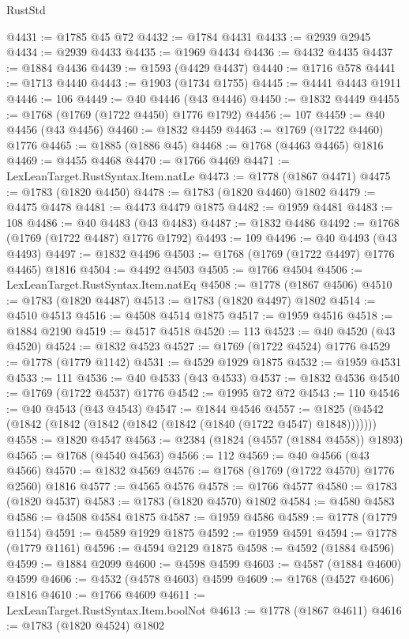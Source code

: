 \begin{lexlean}{RustStd}
\begin{coremodule}
@4431 := @1785 @45 @72
@4432 := @1784 @4431
@4433 := @2939 @2945
@4434 := @2939 @4433
@4435 := @1969 @4434
@4436 := @4432 @4435
@4437 := @1884 @4436
@4439 := @1593 (@4429 @4437)
@4440 := @1716 @578
@4441 := @1713 @4440
@4443 := @1903 (@1734 @1755)
@4445 := @4441 @4443 @1911
@4446 := 106
@4449 := @40 @4446 (@43 @4446)
@4450 := @1832 @4449
@4455 := @1768 (@1769 (@1722 @4450) @1776 @1792)
@4456 := 107
@4459 := @40 @4456 (@43 @4456)
@4460 := @1832 @4459
@4463 := @1769 (@1722 @4460) @1776
@4465 := @1885 (@1886 @45)
@4468 := @1768 (@4463 @4465) @1816
@4469 := @4455 @4468
@4470 := @1766 @4469
@4471 := LexLeanTarget.RustSyntax.Item.natLe
@4473 := @1778 (@1867 @4471)
@4475 := @1783 (@1820 @4450)
@4478 := @1783 (@1820 @4460) @1802
@4479 := @4475 @4478
@4481 := @4473 @4479 @1875
@4482 := @1959 @4481
@4483 := 108
@4486 := @40 @4483 (@43 @4483)
@4487 := @1832 @4486
@4492 := @1768 (@1769 (@1722 @4487) @1776 @1792)
@4493 := 109
@4496 := @40 @4493 (@43 @4493)
@4497 := @1832 @4496
@4503 := @1768 (@1769 (@1722 @4497) @1776 @4465) @1816
@4504 := @4492 @4503
@4505 := @1766 @4504
@4506 := LexLeanTarget.RustSyntax.Item.natEq
@4508 := @1778 (@1867 @4506)
@4510 := @1783 (@1820 @4487)
@4513 := @1783 (@1820 @4497) @1802
@4514 := @4510 @4513
@4516 := @4508 @4514 @1875
@4517 := @1959 @4516
@4518 := @1884 @2190
@4519 := @4517 @4518
@4520 := 113
@4523 := @40 @4520 (@43 @4520)
@4524 := @1832 @4523
@4527 := @1769 (@1722 @4524) @1776
@4529 := @1778 (@1779 @1142)
@4531 := @4529 @1929 @1875
@4532 := @1959 @4531
@4533 := 111
@4536 := @40 @4533 (@43 @4533)
@4537 := @1832 @4536
@4540 := @1769 (@1722 @4537) @1776
@4542 := @1995 @72 @72
@4543 := 110
@4546 := @40 @4543 (@43 @4543)
@4547 := @1844 @4546
@4557 := @1825 (@4542 (@1842 (@1842 (@1842 (@1842 (@1842 (@1840 (@1722 @4547) @1848)))))))
@4558 := @1820 @4547
@4563 := @2384 (@1824 (@4557 (@1884 @4558)) @1893)
@4565 := @1768 (@4540 @4563)
@4566 := 112
@4569 := @40 @4566 (@43 @4566)
@4570 := @1832 @4569
@4576 := @1768 (@1769 (@1722 @4570) @1776 @2560) @1816
@4577 := @4565 @4576
@4578 := @1766 @4577
@4580 := @1783 (@1820 @4537)
@4583 := @1783 (@1820 @4570) @1802
@4584 := @4580 @4583
@4586 := @4508 @4584 @1875
@4587 := @1959 @4586
@4589 := @1778 (@1779 @1154)
@4591 := @4589 @1929 @1875
@4592 := @1959 @4591
@4594 := @1778 (@1779 @1161)
@4596 := @4594 @2129 @1875
@4598 := @4592 (@1884 @4596)
@4599 := @1884 @2099
@4600 := @4598 @4599
@4603 := @4587 (@1884 @4600) @4599
@4606 := @4532 (@4578 @4603) @4599
@4609 := @1768 (@4527 @4606) @1816
@4610 := @1766 @4609
@4611 := LexLeanTarget.RustSyntax.Item.boolNot
@4613 := @1778 (@1867 @4611)
@4616 := @1783 (@1820 @4524) @1802

\end{coremodule}
\end{lexlean}
